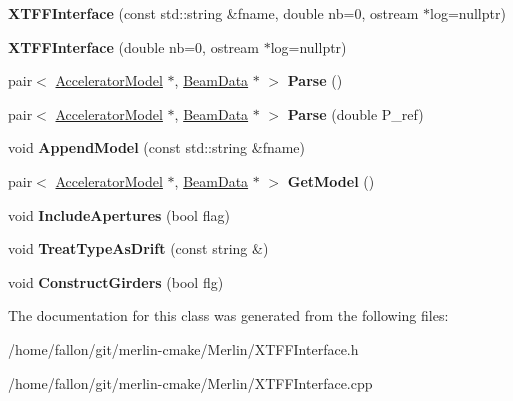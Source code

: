\begin{DoxyCompactItemize}
\item 
\mbox{\label{classXTFFInterface_ae63ee360d9d16b63c48f68a7123a0d6c}} 
{\bfseries X\+T\+F\+F\+Interface} (const std\+::string \&fname, double nb=0, ostream $\ast$log=nullptr)
\item 
\mbox{\label{classXTFFInterface_a9b65c44b80b817496da4172aea237052}} 
{\bfseries X\+T\+F\+F\+Interface} (double nb=0, ostream $\ast$log=nullptr)
\item 
\mbox{\label{classXTFFInterface_a515217adad49cd6669fbfc9e77396203}} 
pair$<$ \hyperlink{classAcceleratorModel}{Accelerator\+Model} $\ast$, \hyperlink{classBeamData}{Beam\+Data} $\ast$ $>$ {\bfseries Parse} ()
\item 
\mbox{\label{classXTFFInterface_a52b70420550d06c8f9c0f6001c112ca0}} 
pair$<$ \hyperlink{classAcceleratorModel}{Accelerator\+Model} $\ast$, \hyperlink{classBeamData}{Beam\+Data} $\ast$ $>$ {\bfseries Parse} (double P\+\_\+ref)
\item 
\mbox{\label{classXTFFInterface_afba8df697f24d2833582aa102f7187f5}} 
void {\bfseries Append\+Model} (const std\+::string \&fname)
\item 
\mbox{\label{classXTFFInterface_a91e6040cda94342313133bea6a0f3de9}} 
pair$<$ \hyperlink{classAcceleratorModel}{Accelerator\+Model} $\ast$, \hyperlink{classBeamData}{Beam\+Data} $\ast$ $>$ {\bfseries Get\+Model} ()
\item 
\mbox{\label{classXTFFInterface_a2690d4f199c62067f2c13b9c64ae3937}} 
void {\bfseries Include\+Apertures} (bool flag)
\item 
\mbox{\label{classXTFFInterface_adbd0d420d4c3aea7227ded1b82a56c0d}} 
void {\bfseries Treat\+Type\+As\+Drift} (const string \&)
\item 
\mbox{\label{classXTFFInterface_aaabc200d2370e1d2a0098d3e32f90e3c}} 
void {\bfseries Construct\+Girders} (bool flg)
\end{DoxyCompactItemize}


The documentation for this class was generated from the following files\+:\begin{DoxyCompactItemize}
\item 
/home/fallon/git/merlin-\/cmake/\+Merlin/X\+T\+F\+F\+Interface.\+h\item 
/home/fallon/git/merlin-\/cmake/\+Merlin/X\+T\+F\+F\+Interface.\+cpp\end{DoxyCompactItemize}
